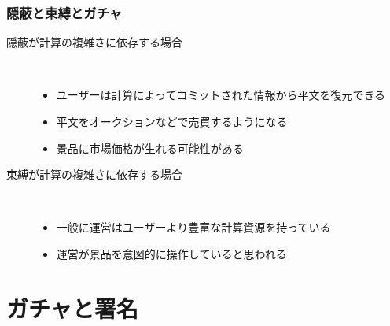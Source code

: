 \begin{frame}
  \frametitle{隠蔽と束縛とガチャ}

  \setlength{\leftmarginii}{0pt}
  \begin{description}
    \item[隠蔽が計算の複雑さに依存する場合]\mbox{}\\
      \begin{itemize}
        \item<2-> ユーザーは計算によってコミットされた情報から平文を復元できる
        \item<3-> 平文をオークションなどで売買するようになる
          \begin{center}
          \end{center}
        \item<5-> 景品に市場価格が生れる可能性がある
      \end{itemize}
    \item[束縛が計算の複雑さに依存する場合]\mbox{}\\
      \begin{itemize}
        \item<6-> 一般に運営はユーザーより豊富な計算資源を持っている
        \item<7-> 運営が景品を意図的に操作していると思われる
          \begin{center}
          \end{center}
      \end{itemize}
  \end{description}
\end{frame}

\section{ガチャと署名}

